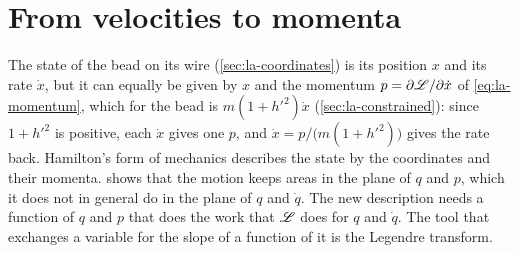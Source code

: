 \section{From velocities to momenta}
\label{sec:ha-legendre}

The state of the bead on its wire (\cref{sec:la-coordinates}) is its
position $x$ and its rate $\dot{x}$, but it can equally be given by $x$
and the momentum $p = \partial\mathscr{L}/\partial\dot{x}$ of
\cref{eq:la-momentum}, which for the bead is $m(1 + h'^2)\dot{x}$
(\cref{sec:la-constrained}): since $1 + h'^2$ is positive, each $\dot{x}$ gives
one $p$, and $\dot{x} = p/\bigl(m(1 + h'^2)\bigr)$ gives the rate back.
Hamilton's form of mechanics describes the state by the coordinates and
their momenta.  shows that
the motion keeps areas in the plane of $q$ and $p$, which it does not in
general do in the plane of $q$ and $\dot{q}$. The new description needs a
function of $q$ and $p$ that does the work that $\mathscr{L}$ does for $q$ and
$\dot{q}$. The tool that exchanges a variable for the slope of a function
of it is the Legendre transform.

